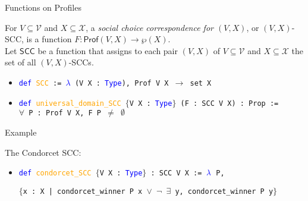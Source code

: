 \documentclass[12pt,xcolor=svgnames,blue,aspectratio=169]{beamer}
\begin{document}
\begin{frame}

{\Huge Functions on Profiles}

\end{frame}
\begin{frame}

\begin{definition} For $V\subseteq\mathcal{V}$ and $X\subseteq\mathcal{X}$, a \textit{social choice correspondence for $(V,X)$}, or $(V,X)$-SCC, is a function  $F: \mathsf{Prof}(V,X)\to \wp(X)$. \\[8pt]


Let $\mathsf{SCC}$ be a function that assigns to each pair $(V,X)$ of $V\subseteq\mathcal{V}$ and $X\subseteq\mathcal{X}$ the set of all $(V,X)$-SCCs.
\end{definition}

\vfill 
\pause 
\begin{itemize}
\item[] \texttt{\textcolor{blue}{def} \textcolor{orange}{SCC} := \textcolor{blue}{$\lambda$} (V X : \textcolor{blue}{Type}), Prof V X $\to$ set X}
\end{itemize}

\vfill 
\pause

\begin{itemize}
\item[] \texttt{\textcolor{blue}{def} \textcolor{orange}{universal\_domain\_SCC} $\{$V X : \textcolor{blue}{Type}$\}$ (F : SCC V X) : Prop :=} \\
\texttt{$\forall$ P : Prof V X, F P $\neq$ $\emptyset$}

\end{itemize}

\end{frame}

\begin{frame}{Example}

The Condorcet SCC: \\[4pt]

\begin{itemize}
\item[] \texttt{\textcolor{blue}{def} \textcolor{orange}{condorcet\_SCC} $\{$V X : \textcolor{blue}{Type}$\}$ : SCC V X := $\textcolor{blue}{\lambda}$ P, }

\texttt{\small $\{$x : X |  condorcet\_winner P x $\vee$  $\neg$ $\exists$ y, condorcet\_winner P y$\}$}
\end{itemize}
\end{frame}
\end{document}
